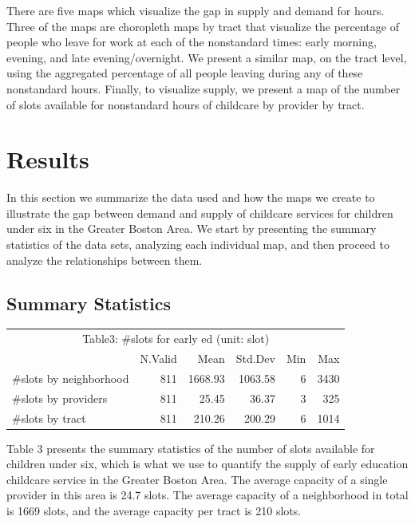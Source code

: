 \documentclass[10pt,letterpaper]{article}
\begin{document}
There are five maps which visualize the gap in supply and demand for
hours. Three of the maps are choropleth maps by tract that visualize the
percentage of people who leave for work at each of the nonstandard
times: early morning, evening, and late evening/overnight. We present a
similar map, on the tract level, using the aggregated percentage of all
people leaving during any of these nonstandard hours. Finally, to
visualize supply, we present a map of the number of slots available for
nonstandard hours of childcare by provider by tract.

\section{Results}\label{results}

In this section we summarize the data used and how the maps we create to
illustrate the gap between demand and supply of childcare services for
children under six in the Greater Boston Area. We start by presenting
the summary statistics of the data sets, analyzing each individual map,
and then proceed to analyze the relationships between them.

\subsection{Summary Statistics}\label{summary-statistics}

\begin{table}[!h]
\centering\begingroup\fontsize{10}{12}\selectfont

\begin{tabular}{l|r|r|r|r|r}
\hline
\multicolumn{6}{c|}{Table3: \#slots for early ed (unit: slot)} \\
\cline{1-6}
  & N.Valid & Mean & Std.Dev & Min & Max\\
\hline
\rowcolor{gray!6}  \#slots by neighborhood & 811 & 1668.93 & 1063.58 & 6 & 3430\\
\hline
\#slots by providers & 811 & 25.45 & 36.37 & 3 & 325\\
\hline
\rowcolor{gray!6}  \#slots by tract & 811 & 210.26 & 200.29 & 6 & 1014\\
\hline
\end{tabular}
\endgroup{}
\end{table}

Table 3 presents the summary statistics of the number of slots available
for children under six, which is what we use to quantify the supply of
early education childcare service in the Greater Boston Area. The
average capacity of a single provider in this area is 24.7 slots. The
average capacity of a neighborhood in total is 1669 slots, and the
average capacity per tract is 210 slots.
\end{document}
